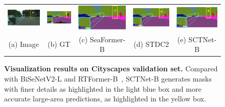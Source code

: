 \documentclass[letterpaper]{article} %
\begin{document}
\begin{figure}[t]
\begin{tabular}{ccccc}
\includegraphics[width=0.19\linewidth]{image/supp/figure6/3a.png}\label{city_3a} &
\hspace{-12pt}
\includegraphics[width=0.19\linewidth]{image/supp/figure6/3b.png}\label{city_3b} &
\hspace{-12pt}
\includegraphics[width=0.19\linewidth]{image/supp/figure6/3c.png}\label{city_3c} &
\hspace{-12pt}
\includegraphics[width=0.19\linewidth]{image/supp/figure6/3d.png}\label{city_3d} &
\hspace{-12pt}
\includegraphics[width=0.19\linewidth]{image/supp/figure6/3e.png}\label{city_3e} \\
(a) Image & (b) GT & (c) SeaFormer-B & (d) STDC2& (e) SCTNet-B\\
\end{tabular}
\caption{\textbf{Visualization results on Cityscapes validation set.} Compared with BiSeNetV2-L\cite{yu2021bisenet} and RTFormer-B~\cite{wang2022rtformer}, SCTNet-B generates masks with finer details as highlighted in the light blue box and more accurate large-area predictions, as highlighted in the yellow box.}
\label{suppfig:vis_cityscapes}

\end{figure}
\end{document}
